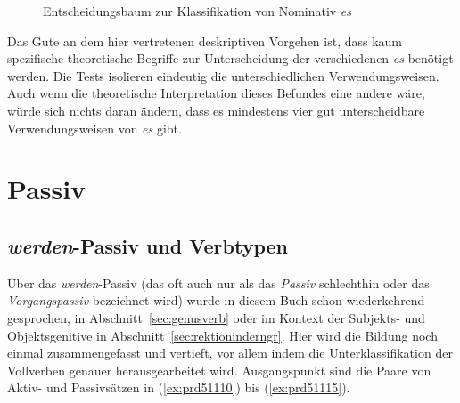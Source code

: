 \begin{figure}[!htbp]
  \caption{Entscheidungsbaum zur Klassifikation von Nominativ \textit{es}}
  \label{fig:escat}
\end{figure}

Das Gute an dem hier vertretenen deskriptiven Vorgehen ist, dass kaum spezifische theoretische Begriffe zur Unterscheidung der verschiedenen \textit{es} benötigt werden.
Die Tests isolieren eindeutig die unterschiedlichen Verwendungsweisen.
Auch wenn die theoretische Interpretation dieses Befundes eine andere wäre, würde sich nichts daran ändern, dass es mindestens vier gut unterscheidbare Verwendungsweisen von \textit{es} gibt.



\section{Passiv}

\label{sec:passiv}

\subsection{\textit{werden}-Passiv und Verbtypen}

\label{sec:werdenpassiv}


Über das \textit{werden}-Passiv (das oft auch nur als das \textit{Passiv} schlechthin oder das \textit{Vorgangspassiv} bezeichnet wird) wurde in diesem Buch schon wiederkehrend gesprochen, \zB in Abschnitt~\ref{sec:genusverb} oder im Kontext der Subjekts- und Objektsgenitive in Abschnitt~\ref{sec:rektioninderngr}.
Hier wird die Bildung noch einmal zusammengefasst und vertieft, vor allem indem die Unterklassifikation der Vollverben genauer herausgearbeitet wird.
Ausgangspunkt sind die Paare von Aktiv- und Passivsätzen in (\ref{ex:prd51110}) bis (\ref{ex:prd51115}).

